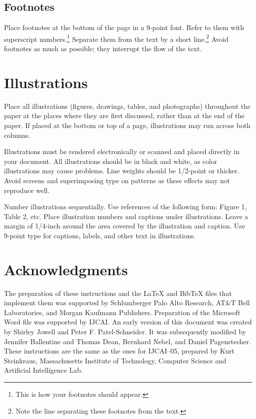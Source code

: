 \documentclass{article}
\theoremstyle{definition}
\begin{document}
\subsection{Footnotes}

Place footnotes at the bottom of the page in a 9-point font.  Refer to
them with superscript numbers.\footnote{This is how your footnotes
should appear.} Separate them from the text by a short
line.\footnote{Note the line separating these footnotes from the
text.} Avoid footnotes as much as possible; they interrupt the flow of
the text.

\section{Illustrations}

Place all illustrations (figures, drawings, tables, and photographs)
throughout the paper at the places where they are first discussed,
rather than at the end of the paper. If placed at the bottom or top of
a page, illustrations may run across both columns.

Illustrations must be rendered electronically or scanned and placed
directly in your document. All illustrations should be in black and
white, as color illustrations may cause problems. Line weights should
be 1/2-point or thicker. Avoid screens and superimposing type on
patterns as these effects may not reproduce well.

Number illustrations sequentially. Use references of the following
form: Figure 1, Table 2, etc. Place illustration numbers and captions
under illustrations. Leave a margin of 1/4-inch around the area
covered by the illustration and caption.  Use 9-point type for
captions, labels, and other text in illustrations.

\section*{Acknowledgments}

The preparation of these instructions and the \LaTeX{} and Bib\TeX{}
files that implement them was supported by Schlumberger Palo Alto
Research, AT\&T Bell Laboratories, and Morgan Kaufmann Publishers.
Preparation of the Microsoft Word file was supported by IJCAI.  An
early version of this document was created by Shirley Jowell and Peter
F. Patel-Schneider.  It was subsequently modified by Jennifer
Ballentine and Thomas Dean, Bernhard Nebel, and Daniel Pagenstecher.
These instructions are the same as the ones for IJCAI--05, prepared by
Kurt Steinkraus, Massachusetts Institute of Technology, Computer
Science and Artificial Intelligence Lab.
\end{document}
